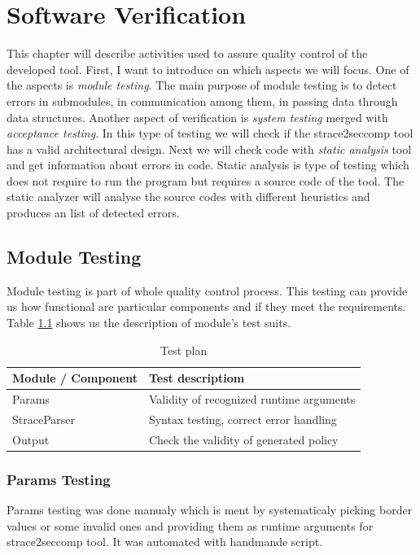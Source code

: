 \chapter{Software Verification}
This chapter will describe activities used to assure quality control of the
developed tool. First, I want to introduce on which aspects we will focus. One
of the aspects is \textit{module testing}. The main purpose of module testing is
to detect errors in submodules, in communication among them, in passing data
through data structures. Another aspect of verification is \textit{system
testing} merged with \textit{acceptance testing}. In this type of testing we
will check if the strace2seccomp tool has a valid architectural design. Next we
will check code with \textit{static analysis} tool and get information about
errors in code. Static analysis is type of testing which does not require to run
the program but requires a source code of the tool. The static analyzer will
analyse the source codes with different heuristics and produces an list of
detected errors.


\section{Module Testing}
Module testing is part of whole quality control process.
This testing can provide us how functional are particular components and if they meet the requirements.
Table \ref{table:moduletesting} shows us the description of module's test suits.

\begin{table}[h]
	\centering
	\begin{tabular}{|l|p{10cm}|}
		\hline
		\textbf{Module / Component}	&	\textbf{Test descriptiom} \\ \hline \hline
		Params 						& Validity of recognized runtime arguments \\ \hline
		StraceParser				& Syntax testing, correct error handling \\ \hline
		Output                      & Check the validity of generated policy \\ \hline
	\end{tabular}
	\caption{Test plan}
	\label{table:moduletesting}
\end{table}

\subsection{Params Testing}
Params testing was done manualy which is ment by systematicaly picking border values
or some invalid ones and providing them as runtime arguments for strace2seccomp tool.
It was automated with handmande script.

